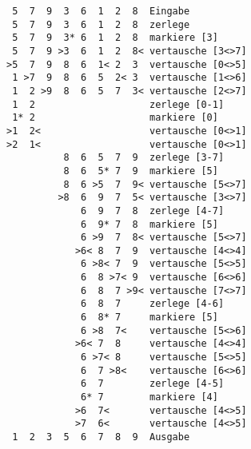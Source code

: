 \documentclass{bschlangaul-aufgabe}
\begin{document}
\begin{enumerate}
\begin{bAntwort}
\begin{verbatim}
 5  7  9  3  6  1  2  8  Eingabe
 5  7  9  3  6  1  2  8  zerlege
 5  7  9  3* 6  1  2  8  markiere [3]
 5  7  9 >3  6  1  2  8< vertausche [3<>7]
>5  7  9  8  6  1< 2  3  vertausche [0<>5]
 1 >7  9  8  6  5  2< 3  vertausche [1<>6]
 1  2 >9  8  6  5  7  3< vertausche [2<>7]
 1  2                    zerlege [0-1]
 1* 2                    markiere [0]
>1  2<                   vertausche [0<>1]
>2  1<                   vertausche [0<>1]
          8  6  5  7  9  zerlege [3-7]
          8  6  5* 7  9  markiere [5]
          8  6 >5  7  9< vertausche [5<>7]
         >8  6  9  7  5< vertausche [3<>7]
             6  9  7  8  zerlege [4-7]
             6  9* 7  8  markiere [5]
             6 >9  7  8< vertausche [5<>7]
            >6< 8  7  9  vertausche [4<>4]
             6 >8< 7  9  vertausche [5<>5]
             6  8 >7< 9  vertausche [6<>6]
             6  8  7 >9< vertausche [7<>7]
             6  8  7     zerlege [4-6]
             6  8* 7     markiere [5]
             6 >8  7<    vertausche [5<>6]
            >6< 7  8     vertausche [4<>4]
             6 >7< 8     vertausche [5<>5]
             6  7 >8<    vertausche [6<>6]
             6  7        zerlege [4-5]
             6* 7        markiere [4]
            >6  7<       vertausche [4<>5]
            >7  6<       vertausche [4<>5]
 1  2  3  5  6  7  8  9  Ausgabe
\end{verbatim}
\end{bAntwort}

\end{enumerate}
\end{document}
